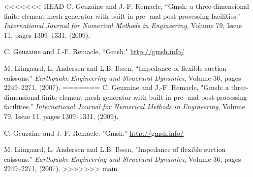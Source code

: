 \documentclass[a4]{article}
\begin{document}
\FloatBarrier

\begin{thebibliography}{99}
	
<<<<<<< HEAD
	 C. Geuzaine and J.-F. Remacle, ``Gmsh: a three-dimensional finite element mesh generator with built-in pre- and post-processing facilities." \textit{International Journal for Numerical Methods in Engineering}, Volume 79, Issue 11, pages 1309--1331, (2009).
	
	 C. Geuzaine and J.-F. Remacle, ``Gmsh." \url{http://gmsh.info/}
	
	 M. Liingaard, L. Andersen and L.B. Ibsen, ``Impedance of flexible suction caissons." \textit{Earthquake Engineering and Structural Dynamics}, Volume 36, pages 2249--2271, (2007).
=======
	 C. Geuzaine and J.-F. Remacle, "Gmsh: a three-dimensional finite element mesh generator with built-in pre- and post-processing facilities." \textit{International Journal for Numerical Methods in Engineering}, Volume 79, Issue 11, pages 1309--1331, (2009).
	
	 C. Geuzaine and J.-F. Remacle, "Gmsh." \url{http://gmsh.info/}
	
	 M. Liingaard, L. Andersen and L.B. Ibsen, "Impedance of flexible suction caissons." \textit{Earthquake Engineering and Structural Dynamics}, Volume 36, pages 2249--2271, (2007).
>>>>>>> main

\end{thebibliography}
\end{document}
